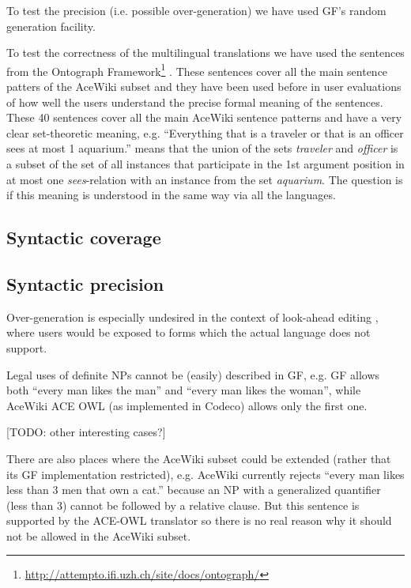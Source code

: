 \documentclass[a4paper]{article}
\begin{document}
To test the precision (i.e. possible over-generation) we have used GF's
random generation facility.

To test the correctness of the multilingual translations we have used
the sentences from the
Ontograph
Framework\footnote{\url{http://attempto.ifi.uzh.ch/site/docs/ontograph/}}
\cite{kuhn2009cnlmain}. These sentences cover all the main sentence
patters of the AceWiki subset and they have been used before in user
evaluations of how well the users understand the precise formal meaning
of the sentences.
These 40 sentences cover all the main AceWiki sentence patterns and have
a very clear set-theoretic meaning, e.g.
``Everything that is a traveler or that is an officer sees
at most 1 aquarium.'' means that the union of the sets \emph{traveler} and
\emph{officer} is a subset of the set of all instances that participate in
the 1st argument position in at most one \emph{sees}-relation with an
instance from the set \emph{aquarium}.
The question is if this meaning is understood in the same way via all the
languages.

\subsection{Syntactic coverage}


\subsection{Syntactic precision}

Over-generation is especially undesired in the context of look-ahead editing
\cite{schwitter:eamt-claw2003}, where users would be exposed to
forms which the actual language does not support.

Legal uses of definite NPs cannot be (easily) described in GF, e.g. GF
allows both ``every man likes the man'' and ``every man likes the woman'',
while AceWiki ACE OWL (as implemented in Codeco) allows only the
first one.

[TODO: other interesting cases?]

There are also
places where the AceWiki subset could be extended (rather that its GF
implementation restricted), e.g. AceWiki currently rejects ``every man
likes less than 3 men that own a cat.'' because an NP with a
generalized quantifier (less than 3) cannot be followed by a relative
clause. But this sentence is supported by the ACE-OWL translator
so there is no real reason why it should not be allowed in the
AceWiki subset.
\end{document}
